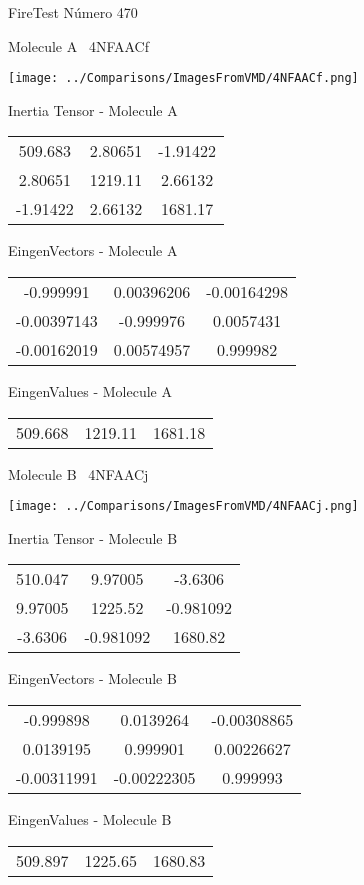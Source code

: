 \vtab[-3cm]
\begin{center}
{\large FireTest \tab Número 470}
\end{center}
\begin{multicols}{2}
\begin{center}

Molecule A \
4NFAACf

\texttt{[image: ../Comparisons/ImagesFromVMD/4NFAACf.png]}

Inertia Tensor - Molecule A \\
\begin{tabular}{|c c c|}
509.683	 & 	2.80651	 & 	-1.91422	 \\
2.80651	 & 	1219.11	 & 	2.66132	 \\
-1.91422	 & 	2.66132	 & 	1681.17
\end{tabular}

\vtab
 EingenVectors - Molecule A     \\
\begin{tabular}{|c c c|}
-0.999991	 & 	0.00396206	 & 	-0.00164298	 \\
-0.00397143	 & 	-0.999976	 & 	0.0057431	 \\
-0.00162019	 & 	0.00574957	 & 	0.999982
\end{tabular}

\vtab
 EingenValues - Molecule A     \\
\begin{tabular}{|c c c|}
509.668	 & 	1219.11	 & 	1681.18	 \\
\end{tabular}
\columnbreak

Molecule B \
4NFAACj

\texttt{[image: ../Comparisons/ImagesFromVMD/4NFAACj.png]}

Inertia Tensor - Molecule B \\
\begin{tabular}{|c c c|}
510.047	 & 	9.97005	 & 	-3.6306	 \\
9.97005	 & 	1225.52	 & 	-0.981092	 \\
-3.6306	 & 	-0.981092	 & 	1680.82
\end{tabular}

\vtab
 EingenVectors - Molecule B     \\
\begin{tabular}{|c c c|}
-0.999898	 & 	0.0139264	 & 	-0.00308865	 \\
0.0139195	 & 	0.999901	 & 	0.00226627	 \\
-0.00311991	 & 	-0.00222305	 & 	0.999993
\end{tabular}

\vtab
 EingenValues - Molecule B     \\
\begin{tabular}{|c c c|}
509.897	 & 	1225.65	 & 	1680.83	 \\
\end{tabular}

\end{center}
\end{multicols}

